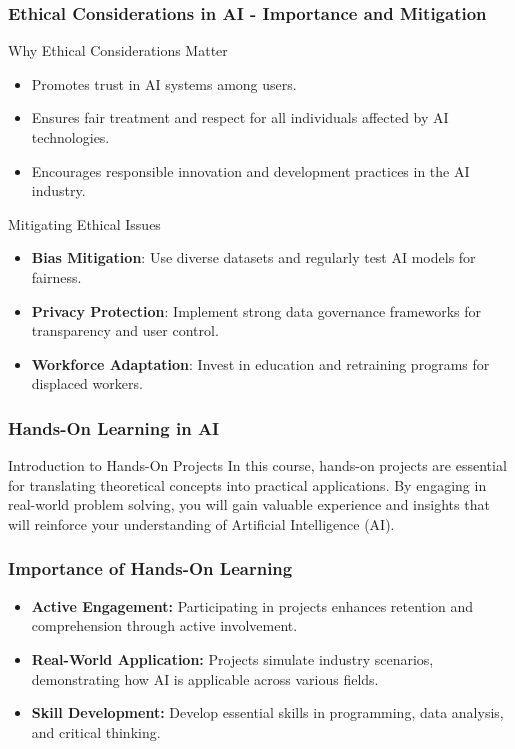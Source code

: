 \documentclass[aspectratio=169]{beamer}
\begin{document}
\begin{frame}[fragile]
    \frametitle{Ethical Considerations in AI - Importance and Mitigation}
    \begin{block}{Why Ethical Considerations Matter}
        \begin{itemize}
            \item Promotes trust in AI systems among users.
            \item Ensures fair treatment and respect for all individuals affected by AI technologies.
            \item Encourages responsible innovation and development practices in the AI industry.
        \end{itemize}
    \end{block}

    \begin{block}{Mitigating Ethical Issues}
        \begin{itemize}
            \item \textbf{Bias Mitigation}: Use diverse datasets and regularly test AI models for fairness.
            \item \textbf{Privacy Protection}: Implement strong data governance frameworks for transparency and user control.
            \item \textbf{Workforce Adaptation}: Invest in education and retraining programs for displaced workers.
        \end{itemize}
    \end{block}
\end{frame}

\begin{frame}[fragile]
    \frametitle{Hands-On Learning in AI}
    \begin{block}{Introduction to Hands-On Projects}
        In this course, hands-on projects are essential for translating theoretical concepts into practical applications. By engaging in real-world problem solving, you will gain valuable experience and insights that will reinforce your understanding of Artificial Intelligence (AI).
    \end{block}
\end{frame}

\begin{frame}[fragile]
    \frametitle{Importance of Hands-On Learning}
    \begin{itemize}
        \item \textbf{Active Engagement:} Participating in projects enhances retention and comprehension through active involvement.
        \item \textbf{Real-World Application:} Projects simulate industry scenarios, demonstrating how AI is applicable across various fields.
        \item \textbf{Skill Development:} Develop essential skills in programming, data analysis, and critical thinking.
    \end{itemize}
\end{frame}
\end{document}

